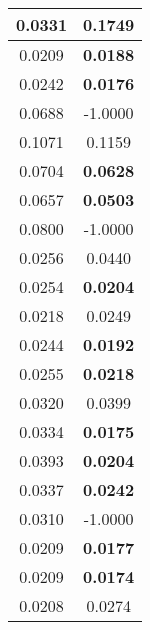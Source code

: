 \begin{longtable}{c|c}
0.0331 & 0.1749 \\\hline
0.0209 & \textbf{0.0188} \\
0.0242 & \textbf{0.0176} \\
0.0688 & -1.0000 \\
0.1071 & 0.1159 \\
0.0704 & \textbf{0.0628} \\
0.0657 & \textbf{0.0503} \\
0.0800 & -1.0000 \\
0.0256 & 0.0440 \\
0.0254 & \textbf{0.0204} \\
0.0218 & 0.0249 \\\hline
0.0244 & \textbf{0.0192} \\
0.0255 & \textbf{0.0218} \\
0.0320 & 0.0399 \\
0.0334 & \textbf{0.0175} \\
0.0393 & \textbf{0.0204} \\
0.0337 & \textbf{0.0242} \\
0.0310 & -1.0000 \\
0.0209 & \textbf{0.0177} \\
0.0209 & \textbf{0.0174} \\
0.0208 & 0.0274 \\ \hline
\end{longtable}

